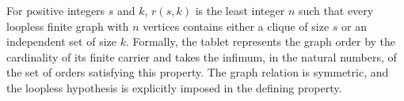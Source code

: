 \begin{definition}
For positive integers $s$ and $k$, $r(s,k)$ is the least integer $n$ such
that every loopless finite graph with $n$ vertices contains either a clique of
size $s$ or an independent set of size $k$.  Formally, the tablet represents
the graph order by the cardinality of its finite carrier and takes the
infimum, in the natural numbers, of the set of orders satisfying this
property.  The graph relation is symmetric, and the loopless hypothesis is
explicitly imposed in the defining property.
\end{definition}
